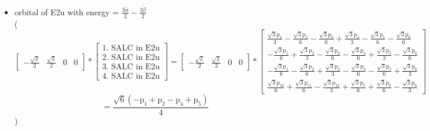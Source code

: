 \documentclass[12pt,a4paper]{article}
\begin{document}
\begin{itemize}
\textcolor{red}{Error in Orthogonalization of SALCs}\item orbital of E2u with energy = 
                                $\frac{3 \tilde{\alpha}}{2} - \frac{3 \tilde{\beta}}{2}$ \\
( 
$$
\left[\begin{matrix}- \frac{\sqrt{2}}{2} & \frac{\sqrt{2}}{2} & 0 & 0\end{matrix}\right] * \left[\begin{array}{c}\text{1. SALC in E2u} \\ \text{2. SALC in E2u} \\ \text{3. SALC in E2u} \\ \text{4. SALC in E2u}\end{array}\right] = \left[\begin{matrix}- \frac{\sqrt{2}}{2} & \frac{\sqrt{2}}{2} & 0 & 0\end{matrix}\right] * \left[\begin{matrix}\frac{\sqrt{3} \text{p}_{1}}{3} - \frac{\sqrt{3} \text{p}_{2}}{6} - \frac{\sqrt{3} \text{p}_{3}}{6} + \frac{\sqrt{3} \text{p}_{4}}{3} - \frac{\sqrt{3} \text{p}_{5}}{6} - \frac{\sqrt{3} \text{p}_{6}}{6}\\- \frac{\sqrt{3} \text{p}_{1}}{6} + \frac{\sqrt{3} \text{p}_{2}}{3} - \frac{\sqrt{3} \text{p}_{3}}{6} - \frac{\sqrt{3} \text{p}_{4}}{6} + \frac{\sqrt{3} \text{p}_{5}}{3} - \frac{\sqrt{3} \text{p}_{6}}{6}\\- \frac{\sqrt{3} \text{p}_{1}}{6} - \frac{\sqrt{3} \text{p}_{2}}{6} + \frac{\sqrt{3} \text{p}_{3}}{3} - \frac{\sqrt{3} \text{p}_{4}}{6} - \frac{\sqrt{3} \text{p}_{5}}{6} + \frac{\sqrt{3} \text{p}_{6}}{3}\\\frac{\sqrt{3} \text{p}_{10}}{6} + \frac{\sqrt{3} \text{p}_{11}}{6} - \frac{\sqrt{3} \text{p}_{12}}{3} + \frac{\sqrt{3} \text{p}_{7}}{6} + \frac{\sqrt{3} \text{p}_{8}}{6} - \frac{\sqrt{3} \text{p}_{9}}{3}\end{matrix}\right] 
 $$ $$ = \frac{\sqrt{6} \left(- \text{p}_{1} + \text{p}_{2} - \text{p}_{4} + \text{p}_{5}\right)}{4} 
 $$ 
 )


\end{itemize}
\end{document}
